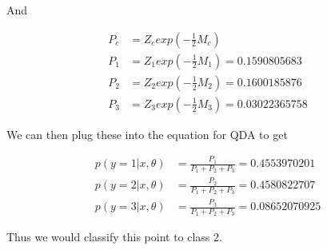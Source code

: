 {And

\begin{align}
    P_c & = Z_c exp(-\frac{1}{2}M_c) \\
    P_1 & = Z_1 exp(-\frac{1}{2}M_1) = 0.1590805683 \\
    P_2 & = Z_2 exp(-\frac{1}{2}M_2) = 0.1600185876 \\
    P_3 & = Z_3 exp(-\frac{1}{2}M_3) = 0.03022365758
\end{align}

We can then plug these into the equation for QDA to get

\begin{align}
    p(y=1|x,\theta) & = \frac{P_1}{P_1+P_2+P_3} = 0.4553970201 \\
    p(y=2|x,\theta) & = \frac{P_2}{P_1+P_2+P_3} = 0.4580822707 \\
    p(y=3|x,\theta) & = \frac{P_3}{P_1+P_2+P_3} = 0.08652070925
\end{align}

Thus we would classify this point to class $2$.

}

\exerciseshere
